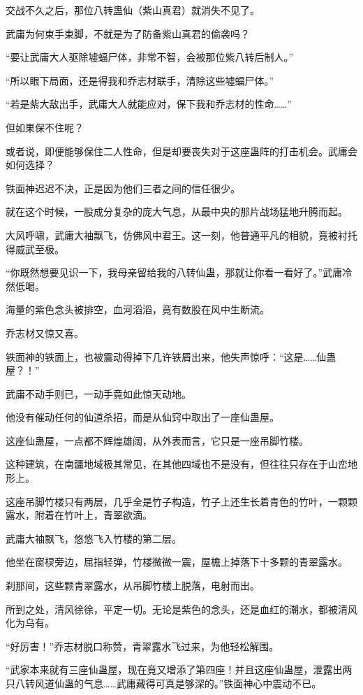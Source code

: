 \begin{this_body}
交战不久之后，那位八转蛊仙（紫山真君）就消失不见了。

武庸为何束手束脚，不就是为了防备紫山真君的偷袭吗？

“要让武庸大人驱除墟蝠尸体，非常不智，会被那位紫八转后制人。”

“所以眼下局面，还是得我和乔志材联手，清除这些墟蝠尸体。”

“若是紫大敌出手，武庸大人就能应对，保下我和乔志材的性命……”

但如果保不住呢？

或者说，即便能够保住二人性命，但是却要丧失对于这座蛊阵的打击机会。武庸会如何选择？

铁面神迟迟不决，正是因为他们三者之间的信任很少。

就在这个时候，一股成分复杂的庞大气息，从最中央的那片战场猛地升腾而起。

大风呼啸，武庸大袖飘飞，仿佛风中君王。这一刻，他普通平凡的相貌，竟被衬托得威武至极。

“你既然想要见识一下，我母亲留给我的八转仙蛊，那就让你看一看好了。”武庸冷然低喝。

海量的紫色念头被排空，血河滔滔，竟有数股在风中生断流。

乔志材又惊又喜。

铁面神的铁面上，也被震动得掉下几许铁屑出来，他失声惊呼：“这是……仙蛊屋？！”

武庸不动手则已，一动手竟如此惊天动地。

他没有催动任何的仙道杀招，而是从仙窍中取出了一座仙蛊屋。

这座仙蛊屋，一点都不辉煌雄阔，从外表而言，它只是一座吊脚竹楼。

这种建筑，在南疆地域极其常见，在其他四域也不是没有，但往往只存在于山峦地形上。

这座吊脚竹楼只有两层，几乎全是竹子构造，竹子上还生长着青色的竹叶，一颗颗露水，附着在竹叶上，青翠欲滴。

武庸大袖飘飞，悠悠飞入竹楼的第二层。

他坐在窗棂旁边，屈指轻弹，竹楼微微一震，屋檐上掉落下十多颗的青翠露水。

刹那间，这些颗青翠露水，从吊脚竹楼上脱落，电射而出。

所到之处，清风徐徐，平定一切。无论是紫色的念头，还是血红的潮水，都被清风化为乌有。

“好厉害！”乔志材脱口称赞，青翠露水飞过来，为他轻松解围。

“武家本来就有三座仙蛊屋，现在竟又增添了第四座！并且这座仙蛊屋，泄露出两只八转风道仙蛊的气息……武庸藏得可真是够深的。”铁面神心中震动不已。


\end{this_body}

